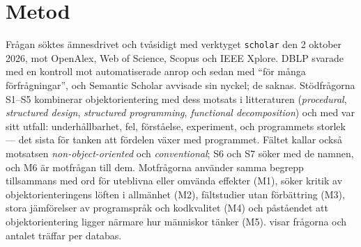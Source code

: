 \section{Metod}
\label{sec:und-metod}

Frågan söktes ämnesdrivet och tvåsidigt med verktyget \texttt{scholar}
den 2 oktober 2026, mot OpenAlex, Web of Science, Scopus och IEEE Xplore.
DBLP svarade med en kontroll mot automatiserade anrop och sedan med
\enquote{för många förfrågningar}, och Semantic Scholar avvisade sin
nyckel; de saknas.  Stödfrågorna S1--S5 kombinerar objektorientering med
dess motsats i litteraturen (\emph{procedural}, \emph{structured design},
\emph{structured programming}, \emph{functional decomposition}) och med
var sitt utfall: underhållbarhet, fel, förståelse, experiment, och
programmets storlek --- det sista för tanken att fördelen växer med
programmet.  Fältet kallar också motsatsen \emph{non-object-oriented}
och \emph{conventional}; S6 och S7 söker med de namnen, och M6 är
motfrågan till dem.  Motfrågorna använder samma begrepp tillsammans med
ord för uteblivna eller omvända effekter (M1), söker kritik av
objektorienteringens löften i allmänhet (M2), fältstudier utan
förbättring (M3), stora jämförelser av programspråk och kodkvalitet
(M4) och påståendet att objektorientering ligger närmare hur människor
tänker (M5).   visar frågorna och
antalet träffar per databas.

